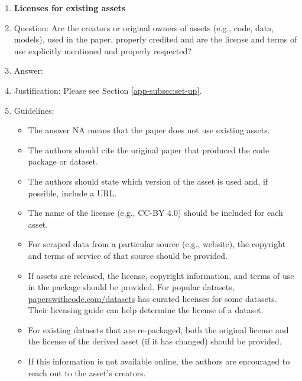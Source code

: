 \documentclass{article}
\begin{document}
\begin{enumerate}
\item {\bf Licenses for existing assets}
    \item[] Question: Are the creators or original owners of assets (e.g., code, data, models), used in the paper, properly credited and are the license and terms of use explicitly mentioned and properly respected?
    \item[] Answer: \answerYes{} %
    \item[] Justification: Please see Section \ref{app-subsec:set-up}.
    \item[] Guidelines:
    \begin{itemize}
        \item The answer NA means that the paper does not use existing assets.
        \item The authors should cite the original paper that produced the code package or dataset.
        \item The authors should state which version of the asset is used and, if possible, include a URL.
        \item The name of the license (e.g., CC-BY 4.0) should be included for each asset.
        \item For scraped data from a particular source (e.g., website), the copyright and terms of service of that source should be provided.
        \item If assets are released, the license, copyright information, and terms of use in the package should be provided. For popular datasets, \url{paperswithcode.com/datasets} has curated licenses for some datasets. Their licensing guide can help determine the license of a dataset.
        \item For existing datasets that are re-packaged, both the original license and the license of the derived asset (if it has changed) should be provided.
        \item If this information is not available online, the authors are encouraged to reach out to the asset's creators.
    \end{itemize}


\end{enumerate}
\end{document}
